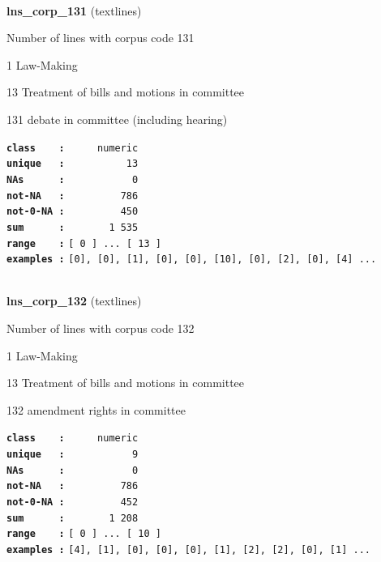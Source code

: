\documentclass[]{article}
\begin{document}
~

\textbf{lns\_corp\_131} (textlines)

Number of lines with corpus code 131

1 Law-Making

13 Treatment of bills and motions in committee

131 debate in committee (including hearing)

\textbf{\texttt{class\ \ \ \ :}} \texttt{~~~~~numeric}\\
\textbf{\texttt{unique\ \ \ :}} \texttt{~~~~~~~~~~13}\\
\textbf{\texttt{NAs\ \ \ \ \ \ :}} \texttt{~~~~~~~~~~~0}\\
\textbf{\texttt{not-NA\ \ \ :}} \texttt{~~~~~~~~~786}\\
\textbf{\texttt{not-0-NA\ :}} \texttt{~~~~~~~~~450}\\
\textbf{\texttt{sum\ \ \ \ \ \ :}} \texttt{~~~~~~~1~535}\\
\textbf{\texttt{range\ \ \ \ :}}
\texttt{{[}\ 0\ {]}\ ...\ {[}\ 13\ {]}}\\
\textbf{\texttt{examples\ :}}
\texttt{{[}0{]},\ {[}0{]},\ {[}1{]},\ {[}0{]},\ {[}0{]},\ {[}10{]},\ {[}0{]},\ {[}2{]},\ {[}0{]},\ {[}4{]}\ ...}\\

~

\textbf{lns\_corp\_132} (textlines)

Number of lines with corpus code 132

1 Law-Making

13 Treatment of bills and motions in committee

132 amendment rights in committee

\textbf{\texttt{class\ \ \ \ :}} \texttt{~~~~~numeric}\\
\textbf{\texttt{unique\ \ \ :}} \texttt{~~~~~~~~~~~9}\\
\textbf{\texttt{NAs\ \ \ \ \ \ :}} \texttt{~~~~~~~~~~~0}\\
\textbf{\texttt{not-NA\ \ \ :}} \texttt{~~~~~~~~~786}\\
\textbf{\texttt{not-0-NA\ :}} \texttt{~~~~~~~~~452}\\
\textbf{\texttt{sum\ \ \ \ \ \ :}} \texttt{~~~~~~~1~208}\\
\textbf{\texttt{range\ \ \ \ :}}
\texttt{{[}\ 0\ {]}\ ...\ {[}\ 10\ {]}}\\
\textbf{\texttt{examples\ :}}
\texttt{{[}4{]},\ {[}1{]},\ {[}0{]},\ {[}0{]},\ {[}0{]},\ {[}1{]},\ {[}2{]},\ {[}2{]},\ {[}0{]},\ {[}1{]}\ ...}\\
\end{document}
